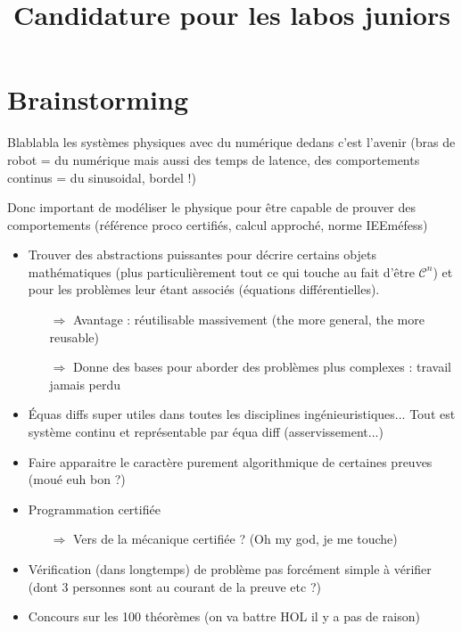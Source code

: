 \documentclass[11pt]{article}
\title{Candidature pour les labos juniors}
\date{}
\author{}
\begin{document}
\maketitle

\section{Brainstorming}

Blablabla les systèmes physiques avec du numérique dedans c'est l'avenir (bras de robot = du numérique mais aussi des temps de latence, des comportements continus = du sinusoidal, bordel !)

Donc important de modéliser le physique pour être capable de prouver des comportements (référence proco certifiés, calcul approché, norme IEEméfess)   

\begin{itemize}
  \item Trouver des abstractions puissantes pour décrire certains objets mathématiques (plus particulièrement tout ce qui touche au fait d'être $\mathcal{C}^n$) et pour les problèmes leur étant associés (équations différentielles).
  \begin{itemize}
    \item[$\Rightarrow$] Avantage : réutilisable massivement (the more general, the more reusable)
    \item[$\Rightarrow$] Donne des bases pour aborder des problèmes plus complexes : travail jamais perdu
  \end{itemize}

  \item Équas diffs super utiles dans toutes les disciplines ingénieuristiques... Tout est système continu et représentable par équa diff (asservissement...)

  \item Faire apparaitre le caractère purement algorithmique de certaines preuves (moué euh bon ?)
  \item Programmation certifiée
  \begin{itemize}
    \item[$\Rightarrow$] Vers de la mécanique certifiée ? (Oh my god, je me touche)
  \end{itemize}

  \item Vérification (dans longtemps) de problème pas forcément simple à vérifier (dont 3 personnes sont au courant de la preuve etc ?)
  \item Concours sur les 100 théorèmes (on va battre HOL il y a pas de raison)
\end{itemize}
\end{document}
